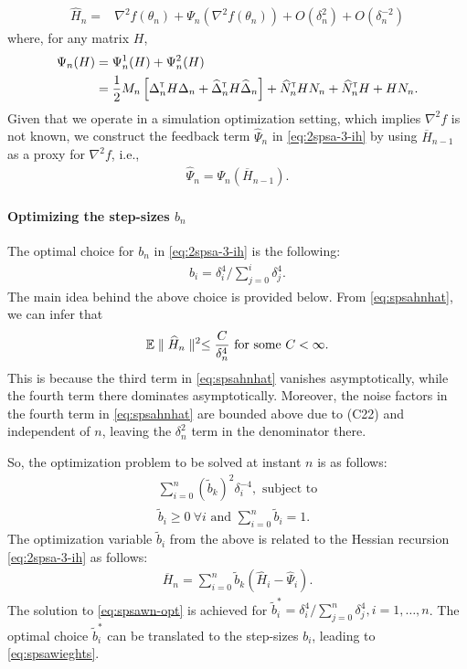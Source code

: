 \begin{align}
\widehat H_n = & \nabla^2 f(\theta_n) + \Psi_{n}(\nabla^2 f(\theta_n)) +  O(\delta_n^2) + O(\delta_n^{-2})  \label{eq:spsahnhat}
\end{align}
where, for any matrix $H$, 
\begin{align}
\Psi_{n}(H) &=  \Psi_{n}^{1}(H) + \Psi_{n}^{2}(H)\nonumber\\
&=  \frac{1}{2}M_n \left[\Delta_n^\mathsf{\scriptscriptstyle T} H \Delta_n + \widehat\Delta_n^\mathsf{\scriptscriptstyle T} H \widehat\Delta_n\right] + \widehat N_n^\mathsf{\scriptscriptstyle T} H N_n + \widehat N_n^\mathsf{\scriptscriptstyle T} H + H N_n.\label{eq:spsapsi}
\end{align}
Given that we operate in a simulation optimization setting, which implies $\nabla^2 f$ is not known, we construct the feedback term $\widehat \Psi_n$ in \eqref{eq:2spsa-3-ih} by using $\overline H_{n-1}$ as a proxy for $\nabla^2 f$, i.e.,
\begin{align}
\widehat \Psi_n = \Psi_{n} (\overline H_{n-1}).
\label{eq:psinhatspsa3}
\end{align}

\paragraph{\textbf{Optimizing the step-sizes }$b_n$}

The optimal choice for $b_n$ in \eqref{eq:2spsa-3-ih}  is the following:
\begin{align}
\label{eq:spsawieghts}
b_i  = \delta_i^{4}/\sum\limits_{j=0}^{i} \delta_j^{4}.
\end{align}
The main idea behind the above choice is provided below.
From \eqref{eq:spsahnhat}, we can infer that
\begin{align*}
\mathbb{E} \parallel \widehat H_n \parallel^2 \le \dfrac{C}{\delta_n^4} \text{ for some } C<\infty. 
\end{align*} 
This is because the third term in \eqref{eq:spsahnhat} vanishes asymptotically, while the fourth term there dominates asymptotically. Moreover, the noise factors in the fourth term in \eqref{eq:spsahnhat} are bounded above due to (C22)  and independent of $n$, leaving the $\delta_n^2$ term in the denominator there. 

So, the optimization problem to be solved at instant $n$ is as follows:
\begin{align}
\sum \limits_{i=0}^{n} (\tilde b_k)^2 \delta_i^{-4}, \text{ subject to} \label{eq:spsawn-opt}\\
\tilde b_i \geq 0 ~\forall i \text{ and }\sum \limits_{i=0}^{n} \tilde b_i = 1.
\end{align}
The optimization variable $\tilde b_i$ from the above is related to the Hessian recursion \eqref{eq:2spsa-3-ih} as follows:
\begin{align}
\label{eq:spsahess}
\overline H_n = \sum\limits_{i=0}^{n} \tilde b_k(\widehat H_i -\widehat \Psi_i).
\end{align}
The solution to \eqref{eq:spsawn-opt} is achieved for $\tilde b_i^* = \delta_i^{4}/\sum \limits_{j=0}^{n} \delta_j^{4}, i=1,\ldots,n$. The optimal choice $\tilde b_i^*$ can be translated to the step-sizes $b_i$, leading to \eqref{eq:spsawieghts}.



